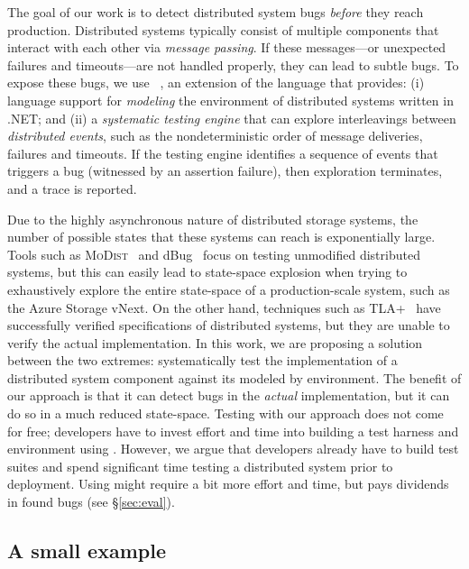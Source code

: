 The goal of our work is to detect distributed system bugs \emph{before} they reach production. Distributed systems typically consist of multiple components that interact with each other via \emph{message passing}. If these messages---or unexpected failures and timeouts---are not handled properly, they can lead to subtle bugs. To expose these bugs, we use \psharp~\cite{deligiannis2015psharp}, an extension of the \csharp language that provides: (i) language support for \emph{modeling} the environment of distributed systems written in .NET; and (ii) a \emph{systematic testing engine} that can explore interleavings between \emph{distributed events}, such as the nondeterministic order of message deliveries, failures and timeouts. If the \psharp testing engine identifies a sequence of events that triggers a bug (witnessed by an assertion failure), then exploration terminates, and a trace is reported.

Due to the highly asynchronous nature of distributed storage systems, the number of possible states that these systems can reach is exponentially large. Tools such as \textsc{MoDist}~\cite{yang2009modist} and dBug~\cite{simsa2011dbug} focus on testing unmodified distributed systems, but this can easily lead to state-space explosion when trying to exhaustively explore the entire state-space of a production-scale system, such as the Azure Storage vNext. On the other hand, techniques such as TLA+~\cite{lamport1994temporal} have successfully verified specifications of distributed systems, but they are unable to verify the actual implementation. In this work, we are proposing a solution between the two extremes: systematically test the implementation of a distributed system component against its modeled by \psharp environment. The benefit of our approach is that it can detect bugs in the \emph{actual} implementation, but it can do so in a much reduced state-space. Testing with our approach does not come for free; developers have to invest effort and time into building a test harness and environment using \psharp. However, we argue that developers already have to build test suites and spend significant time testing a distributed system prior to deployment. Using \psharp might require a bit more effort and time, but pays dividends in found bugs (see \S\ref{sec:eval}).

\subsection{A small example}
\label{sec:overview:example}

